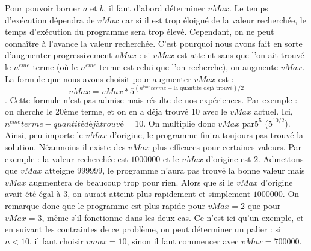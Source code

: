 \documentclass{article}
\begin{document}
Pour pouvoir borner $a$ et $b$, il faut d'abord déterminer $vMax$. Le temps d'exécution dépendra de $vMax$ car si il est trop éloigné de la valeur recherchée, le temps d'exécution du programme sera trop élevé. Cependant, on ne peut connaître à l'avance la valeur recherchée. C'est pourquoi nous avons fait en sorte d'augmenter progressivement $vMax$ : si $vMax$ est atteint sans que l'on ait trouvé le $n^{eme}$ terme (où le $n^{eme}$ terme est celui que l'on recherche), on augmente $vMax$. La formule que nous avons choisit pour augmenter $vMax$ est : \[vMax = vMax * 5^{(n^{ème} terme - \text{la quantité déjà trouvé})/2}\]. Cette formule n'est pas admise mais résulte de nos expériences. Par exemple : on cherche le 20ème terme, et on en a déja trouvé 10 avec le $vMax$ actuel. Ici, $n^{eme} terme - quantité déjà trouvé = 10$. On multiplie donc $vMax$ par$5^{5}$ ($5^{10/2}$). Ainsi, peu importe le $vMax$ d'origine, le programme finira toujours pas trouvé la solution. Néanmoins il existe des $vMax$ plus efficaces pour certaines valeurs. Par exemple : la valeur recherchée est $1 000 000$ et le $vMax$ d'origine est $2$. Admettons que $vMax$ atteigne $999 999$, le programme n'aura pas trouvé la bonne valeur mais $vMax$ augmentera de beaucoup trop pour rien. Alors que si le $vMax$ d'origine avait été égal à $3$, on aurait atteint plus rapidement et simplement $1 000 000$. On remarque donc que le programme est plus rapide pour $vMax = 2$ que pour $vMax = 3$, même s'il fonctionne dans les deux cas. Ce n'est ici qu'un exemple, et en suivant les contraintes de ce problème, on peut déterminer un palier : si $n < 10$, il faut choisir $vmax = 10$, sinon il faut commencer avec $vMax = 700 000$.
\end{document}

